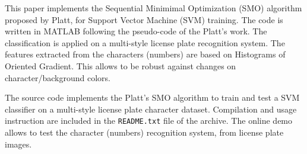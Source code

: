\documentclass{ipol}
\begin{document}



\begin{ipolAbstract}
This paper implements the Sequential Minimimal Optimization (SMO) algorithm proposed by Platt, for Support Vector Machine (SVM) training.
The code is written in MATLAB following the pseudo-code of the Platt's work.
The classification is applied on a multi-style license plate recognition system.
The features extracted from the characters (numbers) are based on Histograms of Oriented Gradient.
This allows to be robust against changes on character/background colors.
\end{ipolAbstract}


\begin{ipolCode}
The source code implements the Platt's SMO algorithm to train and test a SVM classifier on a multi-style license plate character dataset.
Compilation and usage instruction are included in the \verb|README.txt| file of the archive.
The online demo allows to test the character (numbers) recognition system, from license plate images. 
\end{ipolCode}


\end{document}
